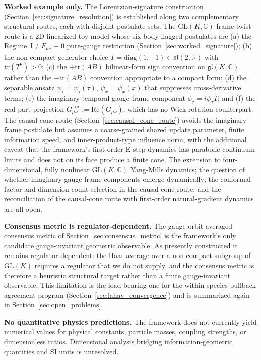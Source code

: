 \documentclass[11pt]{article}
\begin{document}
\textbf{Worked example only.} The Lorentzian-signature construction (Section~\ref{sec:signature_resolution}) is established along two complementary structural routes, each with disjoint postulate sets. The $\mathrm{GL}(K,\mathbb{C})$ frame-twist route is a 2D linearized toy model whose six body-flagged postulates are (a) the Regime~I / $F_{\mu\nu} \equiv 0$ pure-gauge restriction (Section~\ref{sec:worked_signature}); (b) the non-compact generator choice $T = \mathrm{diag}(1,-1) \in \mathfrak{sl}(2,\mathbb{R})$ with $\mathrm{tr}(T^2) > 0$; (c) the $+\mathrm{tr}(AB)$ bilinear-form sign convention on $\mathfrak{gl}(K,\mathbb{C})$ rather than the $-\mathrm{tr}(AB)$ convention appropriate to a compact form; (d) the separable ansatz $\psi_\tau = \psi_\tau(\tau)$, $\psi_x = \psi_x(x)$ that suppresses cross-derivative terms; (e) the imaginary temporal gauge-frame component $\phi_\tau = i\psi_\tau T$; and (f) the real-part projection $G^{\mathrm{Lor}}_{\mu\nu} := \mathrm{Re}(G_{\mu\nu})$, which has no Wick-rotation counterpart. The causal-cone route (Section~\ref{sec:causal_cone_route}) avoids the imaginary-frame postulate but assumes a coarse-grained shared update parameter, finite information speed, and inner-product-type influence norm, with the additional caveat that the framework's first-order E-step dynamics has parabolic continuum limits and does not on its face produce a finite cone. The extension to four-dimensional, fully nonlinear $\mathrm{GL}(K,\mathbb{C})$ Yang-Mills dynamics; the question of whether imaginary gauge-frame components emerge dynamically; the conformal-factor and dimension-count selection in the causal-cone route; and the reconciliation of the causal-cone route with first-order natural-gradient dynamics are all open.

\textbf{Consensus metric is regulator-dependent.} The gauge-orbit-averaged consensus metric of Section~\ref{sec:consensus_metric} is the framework's only candidate gauge-invariant geometric observable. As presently constructed it remains regulator-dependent: the Haar average over a non-compact subgroup of $\mathrm{GL}(K)$ requires a regulator that we do not supply, and the consensus metric is therefore a heuristic structural target rather than a finite gauge-invariant observable. This limitation is the load-bearing one for the within-species pullback agreement program (Section~\ref{sec:lahav_convergence}) and is summarized again in Section~\ref{sec:open_problems}.

\textbf{No quantitative physics predictions.} The framework does not currently yield numerical values for physical constants, particle masses, coupling strengths, or dimensionless ratios. Dimensional analysis bridging information-geometric quantities and SI units is unresolved.
\end{document}
